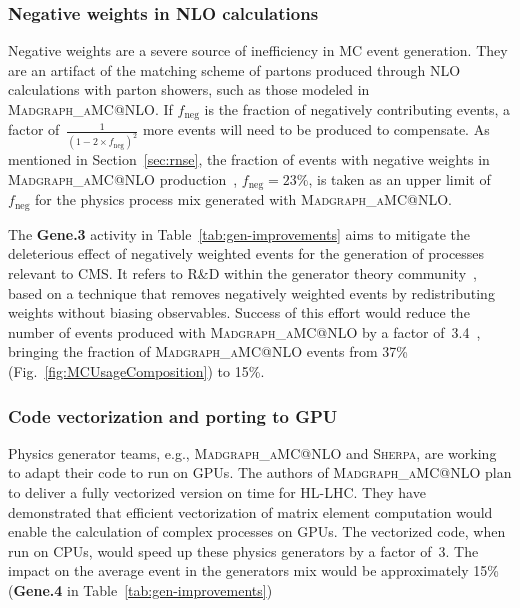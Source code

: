 \subsubsection{Negative weights in NLO calculations}
\label{sec:Negative}

Negative weights are a severe source of inefficiency in \gls{MC} event generation. They are an artifact of the matching scheme of partons produced through \gls{NLO} calculations with parton showers, such as those modeled in \textsc{Madgraph\_aMC@NLO}. If $f_{\text{neg}}$ is the fraction of negatively contributing events, a factor of~$\frac{1}{(1-2\times f_{\text{neg}})^2}$ more events will need to be produced to compensate. As mentioned in Section~\ref{sec:rnse}, the fraction of events with negative weights in \textsc{Madgraph\_aMC@NLO} \ttbar production~\cite{NegWeight}, $f_{\text{neg}}=23\%$, is taken as an upper limit of $f_{\text{neg}}$ for the \PhaseTwo physics process mix generated with \textsc{Madgraph\_aMC@NLO}.

The \textbf{Gene.3} activity in Table~\ref{tab:gen-improvements} aims to mitigate the deleterious effect of negatively weighted events for the generation of processes relevant to CMS. It refers to R\&D within the generator theory community~\cite{Andersen:2023cku, Andersen:2021mvw, Shyamsundar:2025arcane}, based on a technique that removes negatively weighted events by redistributing weights without biasing observables. Success of this effort would reduce the number of events produced with \textsc{Madgraph\_aMC@NLO} by a factor of~3.4~\cite{NegWeight}, bringing the fraction of \textsc{Madgraph\_aMC@NLO} events from 37\% (Fig.~\ref{fig:MCUsageComposition}) to 15\%.

\subsubsection{Code vectorization and porting to \gls{GPU}}

Physics generator teams, e.g.,  \textsc{Madgraph\_aMC@NLO} and \textsc{Sherpa}, are working to adapt their code to run on \glspl{GPU}. The authors of \textsc{Madgraph\_aMC@NLO} plan to deliver a fully vectorized version on time for \gls{HL-LHC}. They have demonstrated that efficient vectorization of matrix element computation would enable the calculation of complex processes on \glspl{GPU}. The vectorized code, when run on \glspl{CPU}, would speed up these physics generators by a factor of~3. The impact on the average event in the \PhaseTwo generators mix would be approximately 15\% (\textbf{Gene.4} in Table~\ref{tab:gen-improvements})


